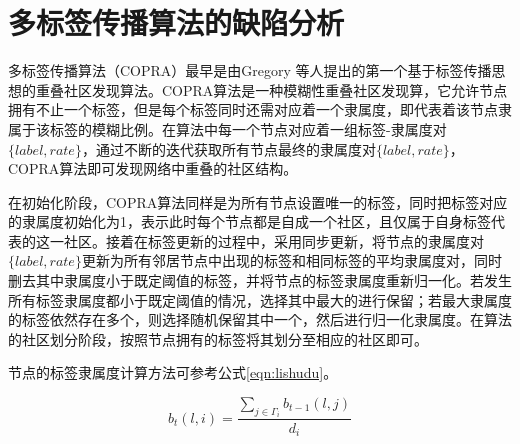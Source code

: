 \section{多标签传播算法的缺陷分析}

多标签传播算法（COPRA）\cite{Gregory2009Finding}最早是由Gregory 等人提出的第一个基于标签传播思想的重叠社区发现算法。COPRA算法是一种模糊性重叠社区发现算，它允许节点拥有不止一个标签，但是每个标签同时还需对应着一个隶属度，即代表着该节点隶属于该标签的模糊比例。在算法中每一个节点对应着一组标签-隶属度对$ \{ label, rate\} $，通过不断的迭代获取所有节点最终的隶属度对$ \{ label, rate\} $，COPRA算法即可发现网络中重叠的社区结构。

在初始化阶段，COPRA算法同样是为所有节点设置唯一的标签，同时把标签对应的隶属度初始化为1，表示此时每个节点都是自成一个社区，且仅属于自身标签代表的这一社区。接着在标签更新的过程中，采用同步更新，将节点的隶属度对$ \{ label, rate\} $更新为所有邻居节点中出现的标签和相同标签的平均隶属度对，同时删去其中隶属度小于既定阈值的标签，并将节点的标签隶属度重新归一化。若发生所有标签隶属度都小于既定阈值的情况，选择其中最大的进行保留；若最大隶属度的标签依然存在多个，则选择随机保留其中一个，然后进行归一化隶属度。在算法的社区划分阶段，按照节点拥有的标签将其划分至相应的社区即可。

节点的标签隶属度计算方法可参考公式\ref{eqn:lishudu}。

\begin{equation}
  \label{eqn:lishudu}
  b_t(l,i)=\frac{\sum_{j\in \Gamma_i }b_{t-1}(l,j)}{d_i}
\end{equation}

